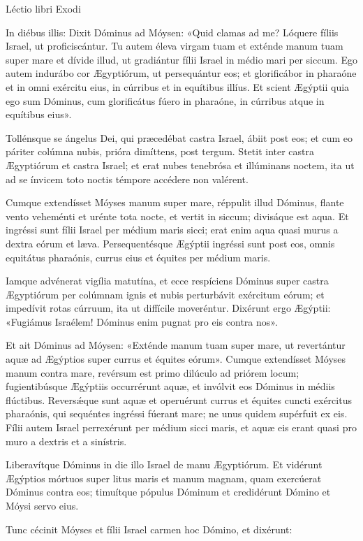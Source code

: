 
Léctio libri Exodi

In diébus illis: Dixit Dóminus ad Móysen: «Quid clamas ad me? Lóquere fíliis Israel, ut proficiscántur. Tu autem éleva virgam tuam et exténde manum tuam super mare et dívide illud, ut gradiántur fílii Israel in médio mari per siccum.
Ego autem indurábo cor Ægyptiórum, ut persequántur eos; et glorificábor in pharaóne et in omni exércitu eius, in cúrribus et in equítibus illíus.
Et scient Ægýptii quia ego sum Dóminus, cum glorificátus fúero in pharaóne, in cúrribus atque in equítibus eius».

Tollénsque se ángelus Dei, qui præcedébat castra Israel, ábiit post eos; et cum eo páriter colúmna nubis, prióra dimíttens, post tergum.
Stetit inter castra Ægyptiórum et castra Israel; et erat nubes tenebrósa et illúminans noctem, ita ut ad se ínvicem toto noctis témpore accédere non valérent.

Cumque extendísset Móyses manum super mare, réppulit illud Dóminus, flante vento veheménti et urénte tota nocte, et vertit in siccum; divisáque est aqua.
Et ingréssi sunt fílii Israel per médium maris sicci; erat enim aqua quasi murus a dextra eórum et læva. Persequentésque Ægýptii ingréssi sunt post eos, omnis equitátus pharaónis, currus eius et équites per médium maris.

Iamque advénerat vigília matutína, et ecce respíciens Dóminus super castra Ægyptiórum per colúmnam ignis et nubis perturbávit exércitum eórum; et impedívit rotas cúrruum, ita ut diffícile moveréntur. Dixérunt ergo Ægýptii: «Fugiámus Israélem! Dóminus enim pugnat pro eis contra nos».

Et ait Dóminus ad Móysen: «Exténde manum tuam super mare, ut revertántur aquæ ad Ægýptios super currus et équites eórum». 
Cumque extendísset Móyses manum contra mare, revérsum est primo dilúculo ad priórem locum; fugientibúsque Ægýptiis occurrérunt aquæ, et invólvit eos Dóminus in médiis flúctibus.
Revers\'{\ae}que sunt aquæ et operuérunt currus et équites cuncti exércitus pharaónis, qui sequéntes ingréssi fúerant mare; ne unus quidem supérfuit ex eis.
Fílii autem Israel perrexérunt per médium sicci maris, et aquæ eis erant quasi pro muro a dextris et a sinístris. 

Liberavítque Dóminus in die illo Israel de manu Ægyptiórum. Et vidérunt Ægýptios mórtuos super litus maris et manum magnam, quam exercúerat Dóminus contra eos; timuítque pópulus Dóminum et credidérunt Dómino et Móysi servo eius.

Tunc cécinit Móyses et fílii Israel carmen hoc Dómino, et dixérunt:

\par
